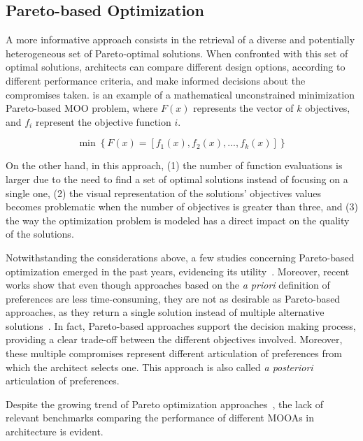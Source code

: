 \subsection{Pareto-based Optimization}

A more informative approach consists in the retrieval of a diverse and potentially heterogeneous set of Pareto-optimal solutions. When confronted with this set of optimal solutions, architects can compare different design options, according to different performance criteria, and make informed decisions about the compromises taken.  is an example of a mathematical unconstrained minimization Pareto-based \ac{MOO} problem, where $F(x)$ represents the vector of $k$ objectives, and $f_i$ represent the objective function $i$.
		
\begin{equation} \label{eq:pareto-based}
   	\min \left\lbrace F(x) = \left[f_1(x), f_2(x), ..., f_k(x)\right] \right\rbrace
\end{equation}
    
On the other hand, in this approach, (1) the number of function evaluations is larger due to the need to find a set of optimal solutions instead of focusing on a single one, (2) the visual representation of the solutions’ objectives values becomes problematic when the number of objectives is greater than three, and (3) the way the optimization problem is modeled has a direct impact on the quality of the solutions.

Notwithstanding the considerations above, a few studies concerning Pareto-based optimization emerged in the past years, evidencing its utility~\cite{Evins2013,Hamdy2016}. Moreover, recent works show that even though
approaches based on the \textit{a priori} definition of preferences are less time-consuming, they are not as desirable as Pareto-based approaches, as they return a single solution instead of multiple alternative solutions~\cite{Attia2013,Hamdy2016,Cichocka2017SURVEY}. In fact, Pareto-based approaches support the decision making process, providing a clear trade-off between the different objectives involved. Moreover, these multiple compromises represent different articulation of preferences from which the architect selects one. This approach is also called \textit{a posteriori} articulation of preferences.

Despite the growing trend of Pareto optimization approaches~\cite{Evins2013, Hamdy2016}, the lack of relevant benchmarks comparing the performance of different \acp{MOOA} in architecture is evident. 

